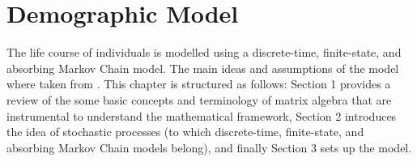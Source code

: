 \documentclass[\main/main.tex]{subfiles}
\begin{document}
\chapter{Demographic Model}

The life course of individuals is modelled using a discrete-time, finite-state, and absorbing Markov Chain model. The main ideas and assumptions of the model where taken from \cite{Caswell2006, VanDaalen2017, Caswell2018}.
This chapter is structured as follows: Section 1 provides a review of the some basic concepts and terminology of matrix algebra that are instrumental to understand the mathematical framework, Section 2 introduces the idea of stochastic processes (to which discrete-time, finite-state, and absorbing Markov Chain models belong), and finally Section 3 sets up the model.





\end{document}
